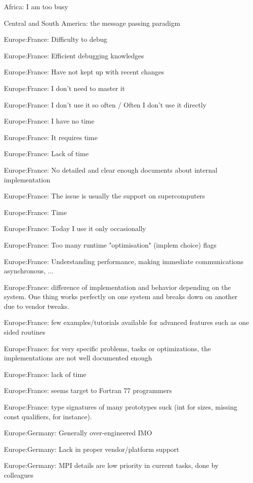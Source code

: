 \item Africa: I am too busy
\item Central and South America: the message passing paradigm
\item Europe:France: Difficulty to debug
\item Europe:France: Efficient debugging knowledges
\item Europe:France: Have not kept up with recent changes
\item Europe:France: I don't need to master it
\item Europe:France: I don't use it so often / Often I don't use it directly
\item Europe:France: I have no time
\item Europe:France: It requires time
\item Europe:France: Lack of time
\item Europe:France: No detailed and clear enough documents about internal implementation
\item Europe:France: The issue is usually the support on supercomputers
\item Europe:France: Time
\item Europe:France: Today I use it only occasionally
\item Europe:France: Too many runtime "optimisation" (implem choice) flags
\item Europe:France: Understanding performance, making immediate communications asynchronous, ...
\item Europe:France: difference of implementation and behavior depending on the system. One thing works perfectly on one system and breaks down on another due to vendor tweaks.
\item Europe:France: few examples/tutorials available for advanced features such as one sided routines
\item Europe:France: for very specific problems, tasks or optimizations, the implementations are not well documented enough
\item Europe:France: lack of time
\item Europe:France: seems target to Fortran 77 programmers
\item Europe:France: type signatures of many prototypes suck (int for sizes, missing const qualifiers, for instance).
\item Europe:Germany: Generally over-engineered IMO
\item Europe:Germany: Lack in proper vendor/platform support
\item Europe:Germany: MPI details are low priority in current tasks, done by colleagues
